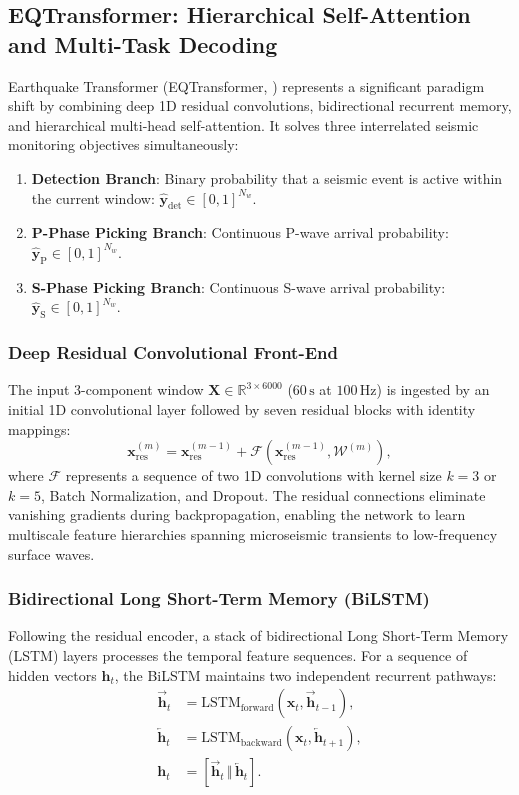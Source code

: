 \subsection{EQTransformer: Hierarchical Self-Attention and Multi-Task Decoding}
Earthquake Transformer (\ac{EQTransformer}, \cite{EQTransformer}) represents a significant paradigm shift by combining deep 1D residual convolutions, bidirectional recurrent memory, and hierarchical multi-head self-attention. It solves three interrelated seismic monitoring objectives simultaneously:
\begin{enumerate}
  \item \textbf{Detection Branch}: Binary probability that a seismic event is active within the current window: $\hat{\mathbf{y}}_{\mathrm{det}} \in [0, 1]^{N_w}$.
  \item \textbf{P-Phase Picking Branch}: Continuous P-wave arrival probability: $\hat{\mathbf{y}}_{\mathrm{P}} \in [0, 1]^{N_w}$.
  \item \textbf{S-Phase Picking Branch}: Continuous S-wave arrival probability: $\hat{\mathbf{y}}_{\mathrm{S}} \in [0, 1]^{N_w}$.
\end{enumerate}

\subsubsection{Deep Residual Convolutional Front-End}
The input 3-component window $\mathbf{X} \in \mathbb{R}^{3 \times 6000}$ ($60\,\mathrm{s}$ at $100\,\mathrm{Hz}$) is ingested by an initial 1D convolutional layer followed by seven residual blocks with identity mappings:
\begin{equation}
  \mathbf{x}_{\mathrm{res}}^{(m)} = \mathbf{x}_{\mathrm{res}}^{(m-1)} + \mathcal{F}\left( \mathbf{x}_{\mathrm{res}}^{(m-1)}, \mathcal{W}^{(m)} \right),
\end{equation}
where $\mathcal{F}$ represents a sequence of two 1D convolutions with kernel size $k=3$ or $k=5$, Batch Normalization, and Dropout. The residual connections eliminate vanishing gradients during backpropagation, enabling the network to learn multiscale feature hierarchies spanning microseismic transients to low-frequency surface waves.

\subsubsection{Bidirectional Long Short-Term Memory (BiLSTM)}
Following the residual encoder, a stack of bidirectional Long Short-Term Memory (\ac{LSTM}) layers processes the temporal feature sequences. For a sequence of hidden vectors $\mathbf{h}_t$, the BiLSTM maintains two independent recurrent pathways:
\begin{align}
  \overrightarrow{\mathbf{h}}_t &= \mathrm{LSTM}_{\mathrm{forward}}\left( \mathbf{x}_t, \overrightarrow{\mathbf{h}}_{t-1} \right), \\
  \overleftarrow{\mathbf{h}}_t &= \mathrm{LSTM}_{\mathrm{backward}}\left( \mathbf{x}_t, \overleftarrow{\mathbf{h}}_{t+1} \right), \\
  \mathbf{h}_t &= \left[ \overrightarrow{\mathbf{h}}_t \, \Big\Vert \, \overleftarrow{\mathbf{h}}_t \right].
\end{align}

